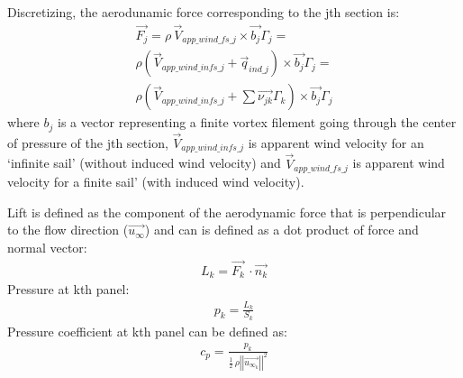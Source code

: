 \documentclass[a4paper,12pt,english]{jupyterBook}
\begin{document}
\sphinxAtStartPar
Discretizing, the aerodunamic force corresponding to the j\sphinxhyphen{}th section is:
\begin{equation*}
\begin{split}
\overrightarrow{F_{j}}=\rho\,\overrightarrow{V}_{app\_wind\_fs\_j} \times \overrightarrow{b_j}\Gamma_{j} = \\
\rho(\overrightarrow{V}_{app\_wind\_infs\_j} + \overrightarrow{q}_{ind\_j}) \times \overrightarrow{b_j}\Gamma_{j} = \\
\rho(\overrightarrow{V}_{app\_wind\_infs\_j} +
\sum{\overrightarrow{\nu_{jk}}\Gamma_{k}}) \times \overrightarrow{b_j}\Gamma_{j}
\end{split}
\end{equation*}
\sphinxAtStartPar
where \(b_j\) is a vector representing a finite vortex filement going through the center of pressure of the j\sphinxhyphen{}th section, \(\overrightarrow{V}_{app\_wind\_infs\_j}\) is apparent wind velocity for an ‘infinite sail’ (without induced wind velocity) and \(\overrightarrow{V}_{app\_wind\_fs\_j}\) is apparent wind velocity for a finite sail’ (with induced wind velocity).

\sphinxAtStartPar
Lift is defined as the component of the aerodynamic force that is perpendicular to the flow direction (\(\overrightarrow{u_{\infty}}\)) and can is defined as a dot product of force and normal vector:
\begin{equation*}
\begin{split}
L_k=\overrightarrow{F_k}\,\cdot \overrightarrow{n_k}
\end{split}
\end{equation*}
\sphinxAtStartPar
Pressure at k\sphinxhyphen{}th panel:
\begin{equation*}
\begin{split}
p_k=\frac{L_k}{S_k}
\end{split}
\end{equation*}
\sphinxAtStartPar
Pressure coefficient at k\sphinxhyphen{}th panel can be defined as:
\begin{equation*}
\begin{split}
c_p=\frac{p_k}{\frac{1}{2}\, \rho {\left|\left|\overrightarrow{u_{\infty_k}}\right|\right|}^2}
\end{split}
\end{equation*}








\renewcommand{\indexname}{Index}
\printindex
\end{document}
